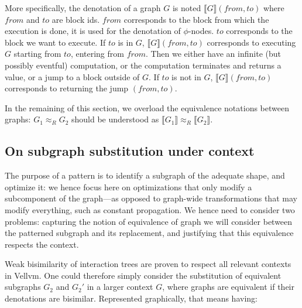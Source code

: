 \documentclass[11pt]{article}
\newcommand{\yz}[1]{\textcolor{ForestGreen}{#1}}
\begin{document}
More specifically, the denotation of a graph $G$ is noted $\llbracket G \rrbracket (from, to)$ where $from$ and $to$ are block ids. $from$ corresponds to the block from which the execution is done, it is used for the denotation of $\phi$-nodes. $to$ corresponds to the block we want to execute. If $to$ is in $G$, $\llbracket G \rrbracket (from, to)$ corresponds to executing $G$ starting from $to$, entering from $from$. Then we either have an infinite (but possibly eventful) computation, or the computation terminates and returns a value, or a jump to a block outside of $G$. If $to$ is not in $G$, $\llbracket G \rrbracket (from, to)$ corresponds to returning the jump $(from, to)$.

In the remaining of this section, we overload the equivalence notations between graphs: $G_1 \approx_R G_2$ should be understood as $\llbracket G_1\rrbracket \approx_R \llbracket G_2\rrbracket$.

\subsection{On subgraph substitution under context}

The purpose of a pattern is to identify a subgraph of the adequate shape, and optimize it: we hence focus here on optimizations that only modify a subcomponent of the graph---as opposed to graph-wide transformations that may modify everything, such as constant propagation. We hence need to consider two problems: capturing the notion of equivalence of graph we will consider between the patterned subgraph and its replacement, and justifying that this equivalence respects the context.




Weak bisimilarity of interaction trees are proven to respect all relevant contexts in Vellvm. One could therefore simply consider the substitution of equivalent subgraphs $G_2$ and $G_2'$ in a larger context $G$, where graphs are equivalent if their denotations are bisimilar. Represented graphically, that means having:
\end{document}
